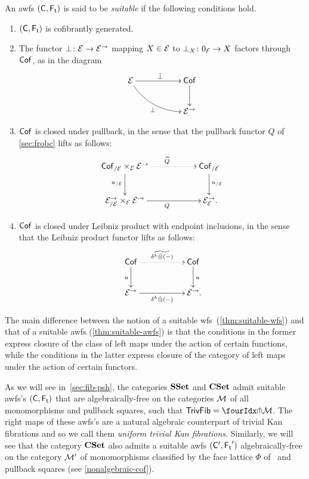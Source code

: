 \documentclass[reqno,10pt,a4paper,oneside,draft]{amsart}
\begin{document}
{{\begin{definition} \label{thm:suitable-awfs}
An awfs $(\CC, \TF)$ is said to be \emph{suitable} if the following conditions hold.
\begin{enumerate}[({S}1)]
\item $(\CC, \TF)$ is cofibrantly generated.
\item The functor $\bot \co \cal{E} \to \cal{E}^\to$ mapping $X \in \cal{E}$ to $\bot_X \co 0_{\cal{E}} \to X$ factors through $\Cof$, as in the diagram
\[
\xymatrix@C+3em{
\catE \ar[r]^{\tilde{\bot}} \ar@/_1pc/[dr]_{\bot} & \Cof \ar[d] \\
  & \catE^\to}
\]
\item $\Cof$ is closed under pullback, in the sense that the pullback functor $Q$ of \cref{sec:frobc} lifts as follows:
\[
\xymatrix@C+3em{
  \Cof_{/\cal{E}} \times_{\cal{E}} \cal{E}^\to
  \ar@{.>}[r]^{\widetilde{Q}}
  \ar[d]_{u_{/\cal{E}}}
&
  \Cof_{/\cal{E}}
  \ar[d]^{u_{/\cal{E}}}
\\
  \catE^\to_{/\cal{E}} \times_{\cal{E}} \calE^\to
  \ar[r]_{Q}
&
  \catE^\to_{\cal{E}}
\rlap{.}}
\]
\item $\Cof$ is closed under Leibniz product with endpoint inclusions, in the sense that the Leibniz product functor lifts as follows:
\[
\xymatrix@C+3em{
  \Cof
  \ar@{.>}[r]^{\widetilde{\kcyl \hatotimes (-)}}
  \ar[d]_{u}
&
 \Cof
  \ar[d]^{u}
\\
  \catE^\to
  \ar[r]_{\kcyl \hatotimes (-)}
&
  \catE^\to
\rlap{.}}
\]
\end{enumerate}
\end{definition}

The main difference between the notion of a suitable wfs~(\cref{thm:suitable-wfs}) and that of a suitable awfs (\cref{thm:suitable-awfs}) is that the conditions in the former express closure of the class of left maps under the action of certain functions, while the conditions in the latter express closure of the category of left maps under the action of certain functors.

\begin{example} \label{unif-triv-fib-sset}
As we will see in~\cref{sec:fib-psh}, the categories $\SSet$ and $\CSet$ admit suitable awfs's $(\CC, \TF)$ that are algebraically-free on the categories $\cal{M}$ of all monomorphisms and pullback squares, \ie such that $\TrivFib = \liftr{\cal{M}}$.
The right maps of these awfs's are a natural algebraic counterpart of trivial Kan fibrations and so we call them \emph{uniform trivial Kan fibrations}.
Similarly, we will see that the category $\CSet$ also admits a suitable awfs $(\CC', \TF')$ algebraically-free on the category $\cal{M}'$ of monomorphisms classified by the face lattice $\Phi$ of~\cite{cohen-et-al:cubicaltt} and pullback squares (see \cref{nonalgebraic-cof}).
\end{example}

}}
\end{document}
